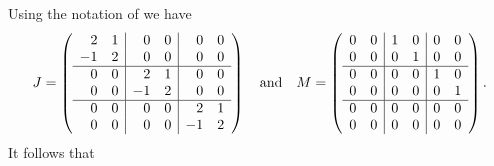 \documentclass{ximera}
\begin{document}
Using the notation of  we have
\[
J = \left(\begin{array}{rr|rr|rr} 
 2 & 1 & 0 & 0 & 0 & 0\\
-1 & 2 & 0 & 0 & 0 & 0 \\  
 \hline
 0 & 0 & 2 & 1 & 0 & 0 \\
 0 & 0 &-1 & 2 & 0 & 0 \\
\hline
 0 & 0 & 0 & 0 & 2 & 1\\
 0 & 0 & 0 & 0 &-1 & 2  \end{array}\right) 
\quad\mbox{and}\quad 
M = \left(\begin{array}{rr|rr|rr} 
 0 & 0 & 1 & 0 & 0 & 0\\
0 & 0 & 0 & 1 & 0 & 0 \\  
 \hline
 0 & 0 & 0 & 0 & 1 & 0 \\
 0 & 0 & 0 & 0 & 0 & 1 \\
\hline
 0 & 0 & 0 & 0 & 0 & 0\\
 0 & 0 & 0 & 0 & 0 & 0  \end{array}\right).
\]
It follows that 
\end{document}
